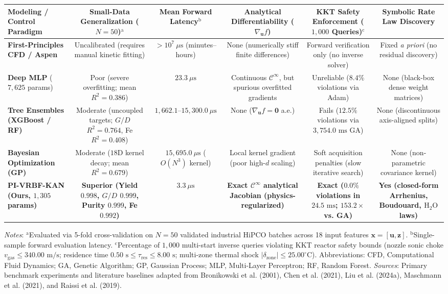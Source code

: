 \documentclass[10pt,journal,onecolumn]{IEEEtran}
\begin{document}
\begin{table}[htbp]\centering\footnotesize
\begin{tabular}{lccccc}\toprule
Modeling / Control Paradigm & Small-Data Generalization ($N = 50$)$^{\text{a}}$ & Mean Forward Latency$^{\text{b}}$ & Analytical Differentiability ($\nabla_{\mathbf{u}} f$) & KKT Safety Enforcement ($1,000$ Queries)$^{\text{c}}$ & Symbolic Rate Law Discovery \\
\midrule
\textbf{First-Principles CFD / Aspen} & Uncalibrated (requires manual kinetic fitting) & $> 10^7\ \mu\text{s}$ (minutes–hours) & None (numerically stiff finite differences) & Forward verification only (no inverse solver) & Fixed \textit{a priori} (no residual discovery) \\
\textbf{Deep MLP} ($7,625$ params) & Poor (severe overfitting; mean $R^2 = 0.386$) & $23.3\ \mu\text{s}$ & Continuous $\mathcal{C}^\infty$, but spurious overfitted gradients & Unreliable ($8.4\%$ violations via Adam) & None (black-box dense weight matrices) \\
\textbf{Tree Ensembles (XGBoost / RF)} & Moderate (uncoupled targets; $G/D$ $R^2 = 0.764$, Fe $R^2 = 0.408$) & $1,662.1\text{--}15,300.0\ \mu\text{s}$ & None ($\nabla_{\mathbf{u}} f = \mathbf{0}$ a.e.) & Fails ($12.5\%$ violations via $3,754.0\text{ ms}$ GA) & None (discontinuous axis-aligned splits) \\
\textbf{Bayesian Optimization (GP)} & Moderate ($18\text{D}$ kernel decay; mean $R^2 = 0.679$) & $15,695.0\ \mu\text{s}$ ($O(N^3)$ kernel) & Local kernel gradient (poor high-$d$ scaling) & Soft acquisition penalties (slow iterative search) & None (non-parametric covariance kernel) \\
\textbf{PI-VRBF-KAN (Ours, $1,305$ params)} & \textbf{Superior (Yield $0.998$, $G/D$ $0.999$, Purity $0.999$, Fe $0.992$)} & \textbf{$3.3\ \mu\text{s}$} & \textbf{Exact $\mathcal{C}^\infty$ analytical Jacobian (physics-regularized)} & \textbf{Exact ($0.0\%$ violations in $24.5\text{ ms}$; $153.2\times$ vs. GA)} & \textbf{Yes (closed-form Arrhenius, Boudouard, $\text{H}_2\text{O}$ laws)} \\
\bottomrule\end{tabular}\end{table}
\textit{Notes}: $^{\text{a}}$Evaluated via 5-fold cross-validation on $N = 50$ validated industrial HiPCO batches across 18 input features $\mathbf{x} = [\mathbf{u}, \mathbf{z}]$. $^{\text{b}}$Single-sample forward evaluation latency. $^{\text{c}}$Percentage of $1,000$ multi-start inverse queries violating KKT reactor safety bounds (nozzle sonic choke $v_{\text{gas}} \le 340.00\text{ m/s}$; residence time $0.50\text{ s} \le \tau_{\text{res}} \le 8.00\text{ s}$; multi-zone thermal shock $|\delta_{\text{zone}}| \le 25.00^\circ\text{C}$). Abbreviations: CFD, Computational Fluid Dynamics; GA, Genetic Algorithm; GP, Gaussian Process; MLP, Multi-Layer Perceptron; RF, Random Forest. \textit{Sources}: Primary benchmark experiments and literature baselines adapted from Bronikowski et al. (2001), Chen et al. (2021), Liu et al. (2024a), Maschmann et al. (2021), and Raissi et al. (2019).
\end{document}
